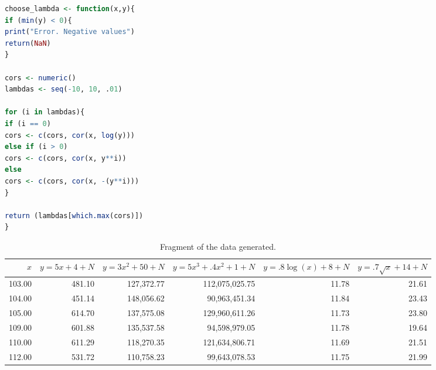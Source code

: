 \documentclass[letterpaper, 10 pt, conference]{article}
\begin{document}
\begin{lstlisting}[language=R, caption={Function for choosing $\lambda$ in a Tukey transformation.}, label={lst:choose-lambda} ]
choose_lambda <- function(x,y){
if (min(y) < 0){
print("Error. Negative values")
return(NaN)
}

cors <- numeric()
lambdas <- seq(-10, 10, .01)

for (i in lambdas){
if (i == 0)
cors <- c(cors, cor(x, log(y)))
else if (i > 0)
cors <- c(cors, cor(x, y**i))
else
cors <- c(cors, cor(x, -(y**i)))
}

return (lambdas[which.max(cors)])
}
\end{lstlisting}

\begin{table}
	\centering
	\caption{Fragment of the data generated.}
	\begin{tabular}{rrrrrr}
		\hline
		$x$ & $y = 5x+4+ N$ & $y = 3x^2 + 50 + N$  & $y = 5x^3 + .4 x^2 + 1 + N$  & $y = .8 \log(x) + 8 + N$  & $y = .7 \sqrt{x} + 14 +N $  \\ 
		\hline
		103.00 & 481.10 & 127,372.77 & 112,075,025.75 & 11.78 & 21.61 \\ 
		104.00 & 451.14 & 148,056.62 & 90,963,451.34 & 11.84 & 23.43 \\ 
		105.00 & 614.70 & 137,575.08 & 129,960,611.26 & 11.73 & 23.80 \\ 
		109.00 & 601.88 & 135,537.58 & 94,598,979.05 & 11.78 & 19.64 \\ 
		110.00 & 611.29 & 118,270.35 & 121,634,806.71 & 11.69 & 21.51 \\ 
		112.00 & 531.72 & 110,758.23 & 99,643,078.53 & 11.75 & 21.99 \\ 
		\hline
	\end{tabular}
\label{tab:xy_data}
\end{table}
\end{document}
